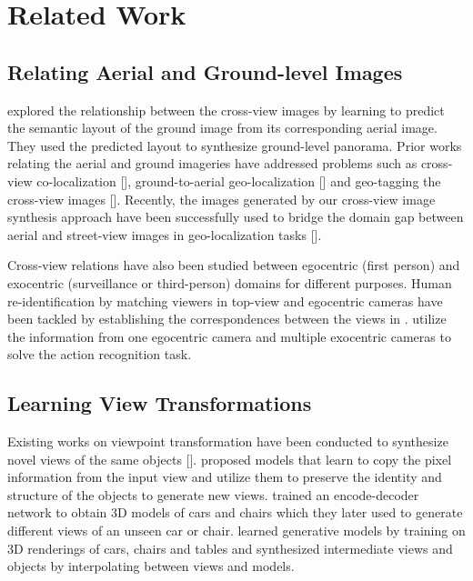 \documentclass[times,twocolumn,final,authoryear]{elsarticle_modified}
\begin{document}
 \vspace{-5pt}
\section{Related Work}
\label{sec:related_work}

\subsection{Relating Aerial and Ground-level Images}
\cite{zhai2017crossview} explored the relationship between the cross-view images by learning to predict the semantic layout of the ground image from its corresponding aerial image. They used the predicted layout to synthesize ground-level panorama. Prior works relating the aerial and ground imageries have addressed problems such as cross-view co-localization [\cite{Lin_2013_CVPR, Vo2016}], ground-to-aerial geo-localization [\cite{DBLP:conf/cvpr/LinCBH15, mh2018cvm}] and geo-tagging the cross-view images [\cite{workman2015wide}]. Recently, the images generated by our cross-view image synthesis approach have been successfully used to bridge the domain gap between aerial and street-view images in geo-localization tasks [\cite{regmi2019bridging}].  

Cross-view relations have also been studied between egocentric (first person) and exocentric (surveillance or third-person) domains for different purposes. Human re-identification by matching viewers in top-view and egocentric cameras have been tackled by establishing the correspondences between the views in \cite{DBLP:conf/eccv/ArdeshirB16}. \cite{soran2014action} utilize the information from one egocentric camera and multiple exocentric cameras to solve the action recognition task. 


\vspace{-5pt}

\subsection{Learning View Transformations}
Existing works on viewpoint transformation have been conducted to synthesize novel views of the same objects [\cite{DTB17,10.1007/978-3-319-46478-7_20,10.1007/978-3-319-46493-0_18}]. \cite{10.1007/978-3-319-46493-0_18} proposed models that learn to copy the pixel information from the input view and utilize them to preserve the identity and structure of the objects to generate new views. \cite{10.1007/978-3-319-46478-7_20} trained an encode-decoder network to obtain 3D models of cars and chairs which they later used to generate different views of an unseen car or chair. \cite{DTB17} learned generative models by training on 3D renderings of cars, chairs and tables and synthesized intermediate views and objects by interpolating between views and models.
\end{document}
